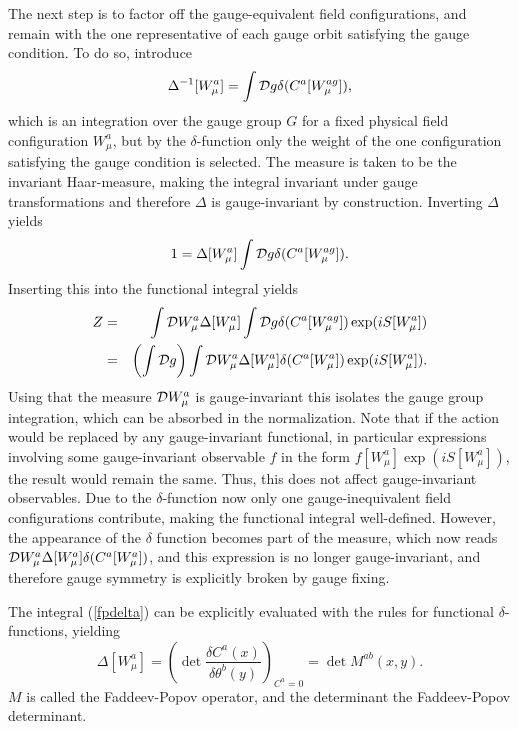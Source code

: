 \documentclass[final,twoside,12pt]{article}
\newcommand*{\no}{\noindent}
\newcommand*{\bea}{\begin{eqnarray}}
\newcommand*{\eea}{\end{eqnarray}}
\newcommand*{\be}{\begin{equation}}
\newcommand*{\ee}{\end{equation}}
\newcommand*{\pref}[1]{(\ref{#1})}
\newcommand*{\nn}{\nonumber}
\newcommand*{\1}{1\!\!\!\bot}
\begin{document}
The next step is to factor off the gauge-equivalent field configurations, and remain with the one representative of each gauge orbit satisfying the gauge condition. To do so, introduce
\be
\Delta^{-1}[W_\mu^a]=\int {\cal D}g \delta(C^a[W_\mu^{ag}])\label{fpdelta},
\ee
\no which is an integration over the gauge group $G$ for a fixed physical field configuration $W_\mu^a$, but by the $\delta$-function only the weight of the one configuration satisfying the gauge condition is selected. The measure is taken to be the invariant Haar-measure, making the integral invariant under gauge transformations and therefore $\Delta$ is gauge-invariant by construction. Inverting $\Delta$ yields
\be
1=\Delta[W_\mu^a]\int{\cal D}g\delta(C^a[W_\mu^{ag}])\label{invertdelta}.
\ee
\no Inserting this into the functional integral yields
\bea
Z&=&\int{\cal D}W_\mu^a \Delta[W_\mu^a]\int{\cal D}g\delta(C^a[W_\mu^{ag}])\exp(iS[W_\mu^a])\nn\\
&=&\left(\int{\cal D}g\right)\int{\cal D}W_\mu^{a}\Delta[W_\mu^{a}]\delta(C^a[W_\mu^{a}])\exp(iS[W_\mu^{a}])\label{gffpexp}.
\eea
\no Using that the measure ${\cal D}W_\mu^a$ is gauge-invariant this isolates the gauge group integration, which can be absorbed in the normalization. Note that if the action would be replaced by any gauge-invariant functional, in particular expressions involving some gauge-invariant observable $f$ in the form $f[W_\mu^a]\exp(iS[W_\mu^a])$, the result would remain the same. Thus, this does not affect gauge-invariant observables. Due to the $\delta$-function now only one gauge-inequivalent field configurations contribute, making the functional integral well-defined. However, the appearance of the $\delta$ function becomes part of the measure, which now reads ${\cal D}W_\mu^a\Delta[W_\mu^{a}]\delta(C^a[W_\mu^{a}])$, and this expression is no longer gauge-invariant, and therefore gauge symmetry is explicitly broken by gauge fixing.

The integral \pref{fpdelta} can be explicitly evaluated with the rules for functional $\delta$-functions, yielding
\be
\Delta[W_\mu^a]=\left(\det\frac{\delta C^a(x)}{\delta\theta^b(y)}\right)_{C^a=0}=\det M^{ab}(x,y)\label{fpdet}.
\ee
\no $M$ is called the Faddeev-Popov operator, and the determinant the Faddeev-Popov determinant.
\end{document}
